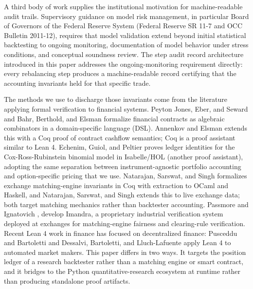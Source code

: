 \documentclass[
  11pt,
  letterpaper,
  DIV=12,
  numbers=noendperiod]{scrartcl}
\numberwithin{equation}{section}
\numberwithin{figure}{section}
\numberwithin{table}{section}
\begin{document}
A third body of work supplies the institutional motivation for
machine-readable audit trails. Supervisory guidance on model risk
management, in particular Board of Governors of the Federal Reserve
System  (Federal Reserve SR 11-7 and OCC
Bulletin 2011-12), requires that model validation extend beyond initial
statistical backtesting to ongoing monitoring, documentation of model
behavior under stress conditions, and conceptual soundness review. The
step audit record architecture introduced in this paper addresses the
ongoing-monitoring requirement directly: every rebalancing step produces
a machine-readable record certifying that the accounting invariants held
for that specific trade.

The methods we use to discharge those invariants come from the
literature applying formal verification to financial systems. Peyton
Jones, Eber, and Seward  and Bahr,
Berthold, and Elsman  formalize financial
contracts as algebraic combinators in a domain-specific language (DSL).
Annenkov and Elsman  extends this
with a Coq proof of contract cashflow semantics; Coq is a proof
assistant similar to Lean 4. Echenim, Guiol, and Peltier
 proves ledger identities for the
Cox-Ross-Rubinstein binomial model in Isabelle/HOL (another proof
assistant), adopting the same separation between instrument-agnostic
portfolio accounting and option-specific pricing that we use. Natarajan,
Sarswat, and Singh  formalizes
exchange matching-engine invariants in Coq with extraction to OCaml and
Haskell, and Natarajan, Sarswat, and Singh
 extends this to live exchange data;
both target matching mechanics rather than backtester accounting.
Passmore and Ignatovich ,
 develop Imandra, a proprietary
industrial verification system deployed at exchanges for matching-engine
fairness and clearing-rule verification. Recent Lean 4 work in finance
has focused on decentralized finance: Pusceddu and Bartoletti
 and Dessalvi, Bartoletti, and
Lluch-Lafuente  apply Lean 4 to
automated market makers. This paper differs in two ways. It targets the
position ledger of a research backtester rather than a matching engine
or smart contract, and it bridges to the Python quantitative-research
ecosystem at runtime rather than producing standalone proof artifacts.
\end{document}
